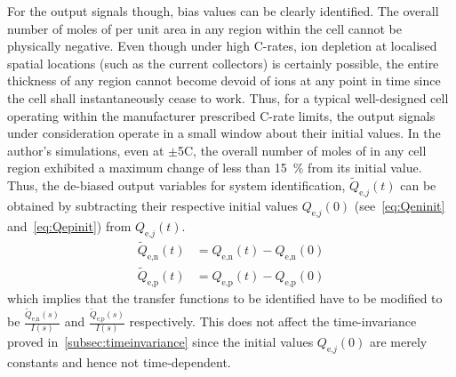 For  the output  signals  though, bias  values can  be  clearly identified.  The
overall number of moles of  per unit area in any region within the cell
cannot be physically negative. Even though  under high C-rates, ion depletion at
localised  spatial  locations (such  as  the  current collectors)  is  certainly
possible, the entire thickness of any region cannot become devoid of ions at any
point in time  since the cell shall  instantaneously cease to work.  Thus, for a
typical well-designed  cell operating within the  manufacturer prescribed C-rate
limits, the output  signals under consideration operate in a  small window about
their initial values. In the author's  simulations, even at $\pm$5C, the overall
number of moles  of  in any  cell region exhibited a  maximum change of
less than \SI{15}{\percent}  from its initial value. Thus,  the de-biased output
variables  for  system  identification, $\widetilde{Q}_{\text{e,}j}(t)$  can  be
obtained  by subtracting  their  respective  initial values  $Q_{\text{e,}j}(0)$
(see~\cref{eq:Qeninit} and~\cref{eq:Qepinit}) from $Q_{\text{e,}j}(t)$.
\begin{align}
    \widetilde{Q}_\text{e,n}(t) & = {Q}_\text{e,n}(t) - {Q}_\text{e,n}(0) \\
    \widetilde{Q}_\text{e,p}(t) & = {Q}_\text{e,p}(t) - {Q}_\text{e,p}(0)
\end{align}
which   implies   that   the   transfer  functions   to   be   identified   have
to   be   modified    to   be   $\frac{\widetilde{Q}_\text{e,n}(s)}{I(s)}$   and
$\frac{\widetilde{Q}_\text{e,p}(s)}{I(s)}$  respectively. This  does not  affect
the time-invariance proved  in~\cref{subsec:timeinvariance} since the initial
values $Q_{\text{e,}j}(0)$ are merely constants and hence not time-dependent.

